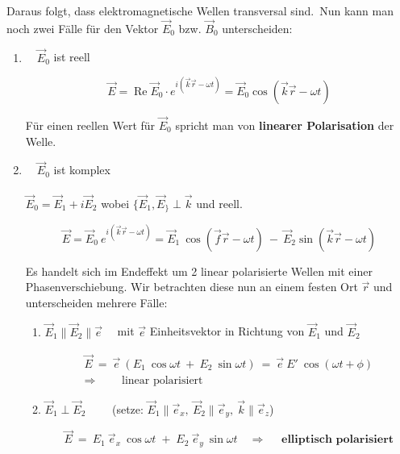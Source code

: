 Daraus folgt, dass elektromagnetische Wellen transversal sind.\
Nun kann man noch zwei Fälle für den Vektor $\vec{E}_0$ bzw. $\vec{B}_0$ unterscheiden:

\begin{enumerate}[label=\textbf{\arabic* .}]

\item $ \quad \vec{E}_0$ ist reell

\begin{equation}
\vec{E} = \operatorname{Re} \vec{E}_0 \cdot e^{i(\vec{k}\vec{r}-\omega t)} = \vec{E}_0 \cos(\vec{k}\vec{r}-\omega t) 
\end{equation}

Für einen reellen Wert für $\vec{E}_0$ spricht man von \textbf{linearer Polarisation} der Welle.

\item $\quad \vec{E}_0$ ist komplex\\
\ \\
$\vec{E}_0 =\vec{E}_1 + i\vec{E}_2$ wobei $\{\vec{E}_1,\vec{E}_\}\perp\vec{k}$ und reell.

\begin{equation*}
\vec{E} = \vec{E}_0 \ e^{i(\vec{k}\vec{r}-\omega t)} = \vec{E}_1 \ \cos(\vec{f}\vec{r}-\omega t) \ - \ \vec{E}_2 \sin (\vec{k}\vec{r} - \omega t)
\end{equation*}

Es handelt sich im Endeffekt um 2 linear polarisierte Wellen mit einer Phasenverschiebung. Wir betrachten diese nun an einem festen Ort $\vec{r}$ und unterscheiden mehrere Fälle:

\begin{enumerate}
\item $\vec{E}_1\parallel\vec{E}_2\parallel\vec{e} \quad $ mit $\vec{e}$ Einheitsvektor in Richtung von $\vec{E}_1$ und $\vec{E}_2$

\begin{align*}
\vec{E} \ = \ \vec{e} \ (E_1 \ \cos \omega t \ + \ E_2 \ \sin \omega t) \  = \  \vec{e}  \ E' \ \cos(\omega t + \phi)\\
\Rightarrow \qquad \text{ linear polarisiert}
\end{align*}

\item $\vec{E}_1\perp\vec{E}_2 \qquad$ (setze: $\vec{E}_1\parallel\vec{e}_x, \  \vec{E}_2\parallel\vec{e}_y, \  \vec{k}\parallel\vec{e}_z$)

\begin{equation*}
\vec{E} \ = \ E_1 \ \vec{e}_x \ \cos \omega t \; + \; E_2 \ \vec{e}_y \ \sin\omega t
\quad\Rightarrow \quad \textbf{ elliptisch polarisiert}
\end{equation*}


\end{enumerate}
\end{enumerate}
